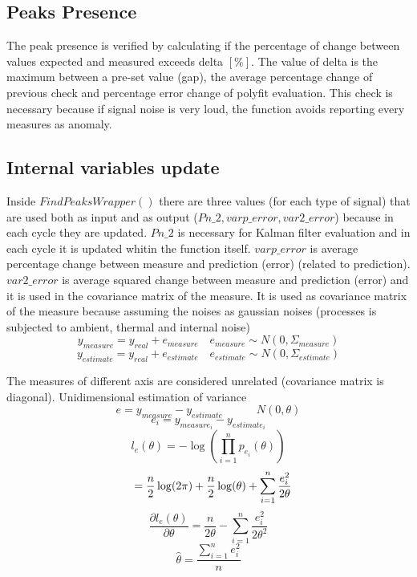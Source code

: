 \documentclass[journal]{IEEEtran}
\begin{document}
\subsection{Peaks Presence}
The peak presence is verified by calculating if the percentage of change between values expected and measured exceeds delta \([\%]\).
The value of delta is the maximum between a pre-set value (gap), the average percentage change of previous check and percentage error change of polyfit evaluation. This check is necessary because if signal noise is very loud, the function avoids reporting every measures as anomaly.

\subsection{Internal variables update}
Inside \(FindPeaksWrapper()\) there are three values (for each type of signal) that are used both as input and as output (\(Pn\_2, varp\_error, var2\_error\)) because in each cycle they are updated.
\(Pn\_2\) is necessary for Kalman filter evaluation and in each cycle it is updated whitin the function itself.
\(varp\_error\) is average percentage change between measure and prediction (error) (related to prediction).
\(var2\_error\) is average squared change between measure and prediction (error) and it is used in the covariance matrix of the measure.
It is used as covariance matrix of the measure because assuming the noises as gaussian noises (processes is subjected to ambient, thermal and internal noise)
\begin{displaymath}
    y_{measure} = y_{real} + e_{measure}  \quad  e_{measure}  \sim  N(0, \Sigma_{measure})
\end{displaymath}
\begin{displaymath}
    y_{estimate} = y_{real} + e_{estimate}  \quad  e_{estimate}  \sim  N(0, \Sigma_{estimate})
\end{displaymath}

The measures of different axis are considered unrelated (covariance matrix is diagonal).
Unidimensional estimation of variance
\begin{displaymath}
    e = y_{measure} - y_{estimate} \quad \quad \quad N(0, \theta)
\end{displaymath}
\begin{displaymath}
    e_{i} = y_{measure_{i}} - y_{estimate_{i}}
\end{displaymath}
\begin{displaymath}
    l_{e}(\theta) = -\log \left ( \prod_{i=1}^n p_{e_i}(\theta) \right ) 
\end{displaymath}
\begin{displaymath}
    \hspace{3mm} = \frac{n}{2}\log(2\pi) + \frac{n}{2}\log(\theta) + \sum_{i=1}^n \frac{e_i^2}{2\theta}
\end{displaymath}
\begin{displaymath}
    \frac{\partial l_{e}(\theta)}{\partial \theta} = \frac{n}{2\theta}- \sum_{i=1}^n \frac{e_i^2}{2\theta^2}
\end{displaymath}
\begin{displaymath}
    \hat\theta = \frac{\sum_{i=1}^n e_i^2}{n}
\end{displaymath}
\end{document}
